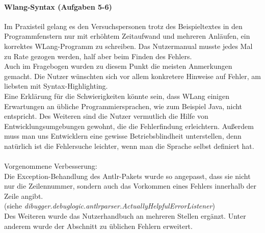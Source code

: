 \documentclass[parskip=full]{scrartcl}
\begin{document}
\paragraph{Wlang-Syntax (Aufgaben 5-6)}
Im Praxisteil gelang es den Versuchspersonen trotz des Beispieltextes in den Programmfenstern nur mit erhöhtem Zeitaufwand und mehreren Anläufen, ein korrektes WLang-Programm zu schreiben. Das Nutzermanual musste jedes Mal zu Rate gezogen werden, half aber beim Finden des Fehlers.\\
Auch im Fragebogen wurden zu diesem Punkt die meisten Anmerkungen gemacht. Die Nutzer wünschten sich vor allem konkretere Hinweise auf Fehler, am liebsten mit Syntax-Highlighting. \\
Eine Erklärung für die Schwierigkeiten könnte sein, dass WLang einigen Erwartungen an übliche Programmiersprachen, wie zum Beispiel Java, nicht entspricht. Des Weiteren sind die Nutzer vermutlich die Hilfe von Entwicklungsumgebungen gewohnt, die die Fehlerfindung erleichtern. Außerdem muss man uns Entwicklern eine gewisse Betriebsblindheit unterstellen, denn natürlich ist die Fehlersuche leichter, wenn man die Sprache selbst definiert hat.\\\\
Vorgenommene Verbesserung:\\
Die Exception-Behandlung des Antlr-Pakets wurde so angepasst, dass sie nicht nur die Zeilennummer, sondern auch das Vorkommen eines Fehlers innerhalb der Zeile angibt.\\
(siehe \textit{dibugger.debuglogic.antlrparser.ActuallyHelpfulErrorListener})\\
Des Weiteren wurde das Nutzerhandbuch an mehreren Stellen ergänzt. Unter anderem wurde der Abschnitt zu üblichen Fehlern erweitert.
%
%
\end{document}
